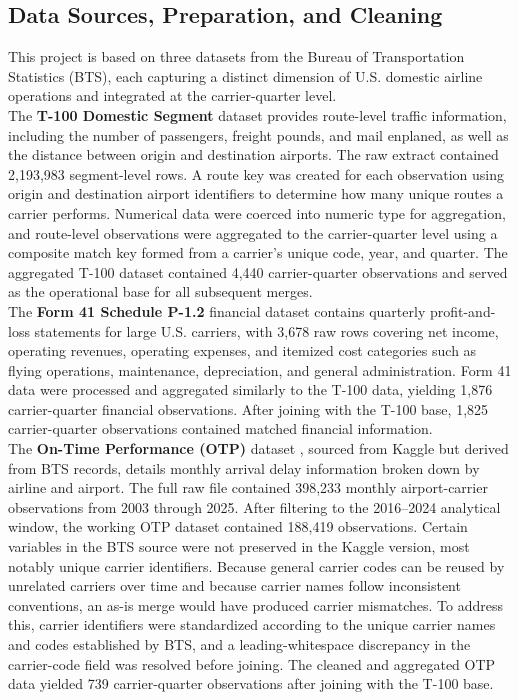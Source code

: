\documentclass[11pt, letterpaper]{article}
\begin{document}
\subsection{Data Sources, Preparation, and Cleaning}
This project is based on three datasets from the Bureau of Transportation Statistics (BTS), each capturing a distinct dimension of U.S. domestic airline operations and integrated at the carrier-quarter level.\\
\indent The \textbf{T-100 Domestic Segment} dataset \cite{bts2026t100} provides route-level traffic information, including the number of passengers, freight pounds, and mail enplaned, as well as the distance between origin and destination airports. The raw extract contained 2,193,983 segment-level rows. A route key was created for each observation using origin and destination airport identifiers to determine how many unique routes a carrier performs. Numerical data were coerced into numeric type for aggregation, and route-level observations were aggregated to the carrier-quarter level using a composite match key formed from a carrier's unique code, year, and quarter. The aggregated T-100 dataset contained 4,440 carrier-quarter observations and served as the operational base for all subsequent merges.\\
\indent The \textbf{Form 41 Schedule P-1.2} financial dataset \cite{bts2026f41} contains quarterly profit-and-loss statements for large U.S. carriers, with 3,678 raw rows covering net income, operating revenues, operating expenses, and itemized cost categories such as flying operations, maintenance, depreciation, and general administration. Form 41 data were processed and aggregated similarly to the T-100 data, yielding 1,876 carrier-quarter financial observations. After joining with the T-100 base, 1,825 carrier-quarter observations contained matched financial information.\\
\indent The \textbf{On-Time Performance (OTP)} dataset \cite{bts2026otp}, sourced from Kaggle \cite{kaggle_bts2026otp} but derived from BTS records, details monthly arrival delay information broken down by airline and airport. The full raw file contained 398,233 monthly airport-carrier observations from 2003 through 2025. After filtering to the 2016--2024 analytical window, the working OTP dataset contained 188,419 observations. Certain variables in the BTS source were not preserved in the Kaggle version, most notably unique carrier identifiers. Because general carrier codes can be reused by unrelated carriers over time and because carrier names follow inconsistent conventions, an as-is merge would have produced carrier mismatches. To address this, carrier identifiers were standardized according to the unique carrier names and codes established by BTS, and a leading-whitespace discrepancy in the carrier-code field was resolved before joining. The cleaned and aggregated OTP data yielded 739 carrier-quarter observations after joining with the T-100 base.\\
\end{document}
